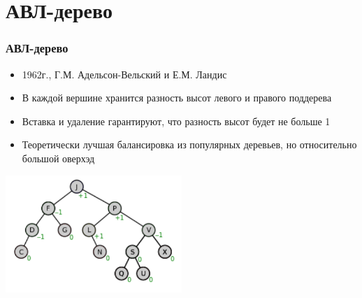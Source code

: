 \documentclass[xetex,mathserif,serif]{beamer}
\begin{document}
    \section{АВЛ-дерево}

    \begin{frame}
        \frametitle{АВЛ-дерево}
        \begin{itemize}
            \item 1962г., Г.М. Адельсон-Вельский и Е.М. Ландис
            \item В каждой вершине хранится разность высот левого и правого поддерева
            \item Вставка и удаление гарантируют, что разность высот будет не больше 1
            \item Теоретически лучшая балансировка из популярных деревьев, но относительно большой оверхэд
        \end{itemize}
        \begin{center}
            \includegraphics[width=0.5\textwidth]{avl-tree.png}
        \end{center}
    \end{frame}
\end{document}
